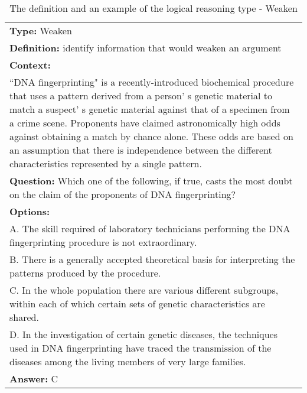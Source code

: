 \documentclass{article} \usepackage{iclr2020_conference,times}
\begin{document}
\begin{table}
	\small
	\centering
	\caption{The definition and an example of the logical reasoning type - Weaken}
	\begin{tabular}{|p{}|}
		\hline
		{\bf Type: } Weaken\\
		
		{\bf Definition: }identify information that would weaken an argument\\
		\hline
\textbf{Context: }\\
``DNA fingerprinting" is a recently-introduced biochemical procedure that uses a pattern derived from a person' s genetic material to match a suspect' s genetic material against that of a specimen from a crime scene. Proponents have claimed astronomically high odds against obtaining a match by chance alone. These odds are based on an assumption that there is independence between the different characteristics represented by a single pattern.\\
\textbf{Question:} Which one of the following, if true, casts the most doubt on the claim of the proponents of DNA fingerprinting?\\
\textbf{Options:} \\
A. The skill required of laboratory technicians performing the DNA fingerprinting procedure is not extraordinary.\\
B. There is a generally accepted theoretical basis for interpreting the patterns produced by the procedure.\\
C. In the whole population there are various different subgroups, within each of which certain sets of genetic characteristics are shared.\\
D. In the investigation of certain genetic diseases, the techniques used in DNA fingerprinting have traced the transmission of the diseases among the living members of very large families.\\
\textbf{Answer: }C\\
		\hline
	\end{tabular}
	\label{tab:weaken}
\end{table}
\end{document}
